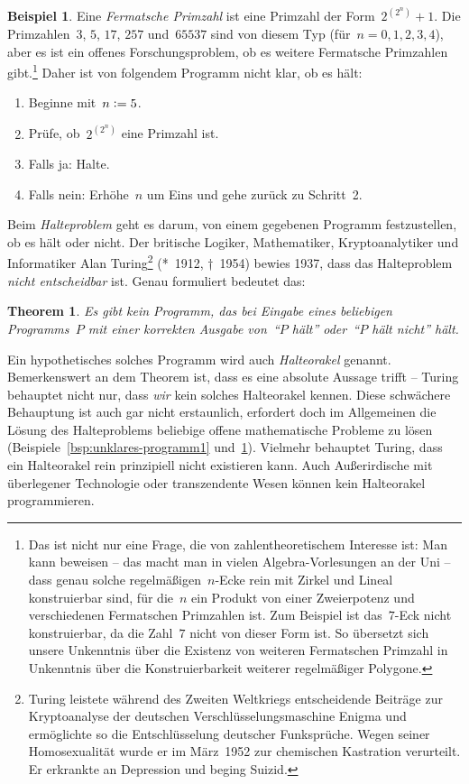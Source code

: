 \documentclass[twoside]{../zirkelblatt1415}
\theoremstyle{definition}
\newtheorem{bsp}[defn]{Beispiel}
\theoremstyle{plain}
\newtheorem{thm}[defn]{Theorem}
\theoremstyle{remark}
\newenvironment{listing}{
  \renewcommand*\theenumi{\arabic{enumi}}
  \renewcommand{\labelenumi}{\theenumi.}
  \begin{enumerate}\itemsep0em}{\end{enumerate}}
\newcommand{\defeq}{\vcentcolon=}
\begin{document}
\begin{bsp}\label{bsp:unklares-programm2}Eine \emph{Fermatsche Primzahl} ist eine Primzahl der
Form~$2^{(2^n)} + 1$. Die Primzahlen~$3$, $5$, $17$, $257$ und~$65537$ sind von
diesem Typ (für~$n = 0,1,2,3,4$), aber es ist ein offenes Forschungsproblem, ob
es weitere Fermatsche Primzahlen gibt.\footnote{Das ist nicht nur eine Frage,
die von zahlentheoretischem Interesse ist: Man kann beweisen -- das macht man
in vielen Algebra-Vorlesungen an der Uni -- dass genau solche
regelmäßigen~$n$-Ecke rein mit Zirkel und Lineal konstruierbar sind, für die~$n$ ein
Produkt von einer Zweierpotenz und verschiedenen Fermatschen Primzahlen ist.
Zum Beispiel ist das~$7$-Eck nicht konstruierbar, da die Zahl~$7$ nicht von
dieser Form ist. So übersetzt sich unsere Unkenntnis über die Existenz von
weiteren Fermatschen Primzahl in Unkenntnis über die Konstruierbarkeit weiterer
regelmäßiger Polygone.}
Daher ist von folgendem Programm nicht
klar, ob es hält:
\begin{listing}
\item[1.] Beginne mit~$n \defeq 5$.
\item[2.] Prüfe, ob~$2^{(2^n)}$ eine Primzahl ist.
\item[3.] Falls ja: Halte.
\item[4.] Falls nein: Erhöhe~$n$ um Eins und gehe zurück zu Schritt~2.
\end{listing}
\end{bsp}

Beim \emph{Halteproblem} geht es darum, von einem gegebenen Programm
festzustellen, ob es hält oder nicht. Der britische Logiker, Mathematiker,
Kryptoanalytiker und Informatiker Alan Turing\footnote{Turing leistete während des
Zweiten Weltkriegs entscheidende Beiträge zur Kryptoanalyse der
deutschen Verschlüsselungsmaschine Enigma und ermöglichte so die
Entschlüsselung deutscher Funksprüche. Wegen seiner Homosexualität wurde er
im März~1952 zur chemischen Kastration verurteilt. Er erkrankte an
Depression und beging Suizid.} (*~1912, †~1954) bewies 1937, dass das Halteproblem
\emph{nicht entscheidbar} ist. Genau formuliert bedeutet das:

\begin{thm}Es gibt kein Programm, das bei Eingabe eines beliebigen Programms~$P$ mit einer
korrekten Ausgabe von~"`$P$ hält"' oder~"`$P$ hält nicht"' hält.\end{thm}

\enlargethispage{2em}

Ein hypothetisches solches Programm wird auch \emph{Halteorakel} genannt.
Bemerkenswert an dem Theorem ist, dass es eine absolute Aussage trifft --
Turing behauptet nicht nur, dass \emph{wir} kein solches Halteorakel kennen.
Diese schwächere Behauptung ist auch gar nicht erstaunlich, erfordert doch im
Allgemeinen die Lösung des Halteproblems beliebige offene mathematische
Probleme zu lösen (Beispiele~\ref{bsp:unklares-programm1} und~\ref{bsp:unklares-programm2}).
Vielmehr behauptet Turing, dass ein Halteorakel rein prinzipiell nicht
existieren kann. Auch Außerirdische mit überlegener Technologie oder
transzendente Wesen können kein Halteorakel programmieren.
\end{document}
